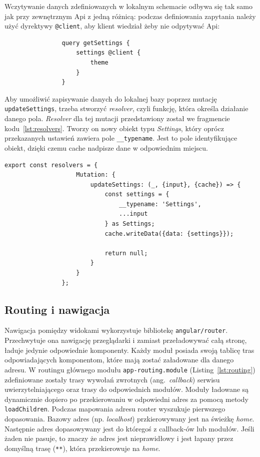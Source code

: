 			Wczytywanie danych zdefiniowanych w lokalnym schemacie odbywa się tak samo jak przy zewnętrznym Api z jedną różnicą:
			podczas definiowania zapytania należy użyć dyrektywy \verb|@client|, aby klient wiedział żeby nie odpytywać Api:
			\begin{lstlisting}
				query getSettings {
					settings @client {
						theme
					}
				}
			\end{lstlisting}

			Aby umożliwić zapisywanie danych do lokalnej bazy poprzez mutację \verb|updateSettings|,
			trzeba stworzyć \emph{resolver}, czyli funkcję, która określa działanie danego pola.
			\emph{Resolver} dla tej mutacji przedstawiony został we fragmencie kodu~\ref{lst:resolvers}.
			Tworzy on nowy obiekt typu \emph{Settings}, który oprócz przekazanych ustawień zawiera pole \verb|__typename|.
			Jest to pole identyfikujące obiekt, dzięki czemu cache nadpisze dane w odpowiednim miejscu.
			\begin{lstlisting}[label=lst:resolvers, caption=\emph{Resolvers} dla lokalnego cache, float=th]
				export const resolvers = {
					Mutation: {
						updateSettings: (_, {input}, {cache}) => {
							const settings = {
								__typename: 'Settings',
								...input
							} as Settings;
							cache.writeData({data: {settings}});

							return null;
						}
					}
				};
			\end{lstlisting}

	\subsection{Routing i nawigacja}
		Nawigacja pomiędzy widokami wykorzystuje bibliotekę \verb|angular/router|.
		Przechwytuje ona nawigację przeglądarki i zamiast przeładowywać całą stronę, ładuje jedynie odpowiednie komponenty.
		Każdy moduł posiada swoją tablicę tras odpowiadających komponentom, które mają zostać załadowane dla danego adresu.
		W routingu głównego modułu \verb|app-routing.module| (Listing~\ref{lst:routing})
		zdefiniowane zostały trasy wywołań zwrotnych (ang.\ \emph{callback}) serwisu uwierzytelniającego oraz trasy do odpowiednich modułów.
		Moduły ładowane są dynamicznie dopiero po przekierowaniu w odpowiedni adres za pomocą metody \verb|loadChildren|.
		Podczas mapowania adresu router wyszukuje pierwszego dopasowania.
		Bazowy adres (np. \emph{localhost}) przkierowywany jest na świeżkę \emph{home}.
		Następnie adres dopasowywany jest do któregoś z callback-ów lub modułów.
		Jeśli żaden nie pasuje, to znaczy że adres jest nieprawidłowy i jest łapany przez domyślną trasę (\verb|**|), która przekierowuje na \emph{home}.

